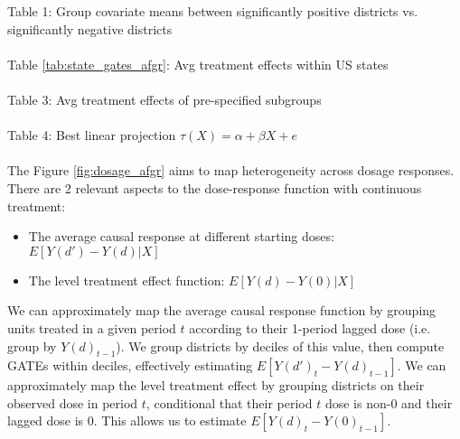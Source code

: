 \documentclass{article} %
\begin{document}
	

Table 1: Group covariate means between significantly positive districts vs. significantly negative districts\\
\\

Table \ref{tab:state_gates_afgr}: Avg treatment effects within US states\\
\\


Table 3: Avg treatment effects of pre-specified subgroups\\
\\

Table 4: Best linear projection $\tau(X) = \alpha + \beta X + e$\\
\\


	The Figure \ref{fig:dosage_afgr} aims to map heterogeneity across dosage responses. There are 2 relevant aspects to the dose-response function with continuous treatment:
\begin{itemize}
	\item The average causal response at different starting doses: $E[Y(d') - Y(d) | X]$
	\item The level treatment effect function: $E[Y(d) - Y(0) | X]$
\end{itemize}
	We can approximately map the average causal response function by grouping units treated in a given period $t$ according to their 1-period lagged dose (i.e. group by $Y(d)_{t-1}$). We group districts by deciles of this value, then compute GATEs within deciles, effectively estimating $E[Y(d')_t - Y(d)_{t-1}]$. We can approximately map the level treatment effect by grouping districts on their observed dose in period $t$, conditional that their period $t$ dose is non-0 and their lagged dose is 0. This allows us to estimate $E[Y(d)_t - Y(0)_{t-1}]$. 
\end{document}
